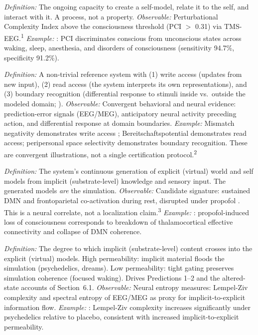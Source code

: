 \documentclass[12pt]{article}
\begin{document}
\begin{description}[leftmargin=0pt,labelindent=0pt,itemsep=0.8em]

\item[\textsc{Consciousness}] \emph{Definition:} The ongoing capacity to create a self-model, relate it to the self, and interact with it. A process, not a property. \emph{Observable:} Perturbational Complexity Index above the consciousness threshold (PCI $>$ 0.31) via TMS-EEG.\textsuperscript{1} \emph{Example:} \citet{Casarotto2016}: PCI discriminates conscious from unconscious states across waking, sleep, anesthesia, and disorders of consciousness (sensitivity 94.7\%, specificity 91.2\%).

\item[\textsc{Model}] \emph{Definition:} A non-trivial reference system with (1) write access (updates from new input), (2) read access (the system interprets its own representations), and (3) boundary recognition (differential response to stimuli inside vs.\ outside the modeled domain; \citealp{Gruber2015}). \emph{Observable:} Convergent behavioral and neural evidence: prediction-error signals (EEG/MEG), anticipatory neural activity preceding action, and differential response at domain boundaries. \emph{Example:} Mismatch negativity demonstrates write access \citep{Naatanen2007}; Bereitschaftspotential demonstrates read access; peripersonal space selectivity demonstrates boundary recognition. These are convergent illustrations, not a single certification protocol.\textsuperscript{2}

\item[\textsc{Self-simulation}] \emph{Definition:} The system's continuous generation of explicit (virtual) world and self models from implicit (substrate-level) knowledge and sensory input. The generated models \emph{are} the simulation. \emph{Observable:} Candidate signature: sustained DMN and frontoparietal co-activation during rest, disrupted under propofol \citep{Raichle2001}. This is a neural correlate, not a localization claim.\textsuperscript{3} \emph{Example:} \citet{Boly2012}: propofol-induced loss of consciousness corresponds to breakdown of thalamocortical effective connectivity and collapse of DMN coherence.

\item[\textsc{Permeability}] \emph{Definition:} The degree to which implicit (substrate-level) content crosses into the explicit (virtual) models. High permeability: implicit material floods the simulation (psychedelics, dreams). Low permeability: tight gating preserves simulation coherence (focused waking). Drives Predictions 1--2 and the altered-state accounts of Section~6.1. \emph{Observable:} Neural entropy measures: Lempel-Ziv complexity and spectral entropy of EEG/MEG as proxy for implicit-to-explicit information flow. \emph{Example:} \citet{Schartner2017}: Lempel-Ziv complexity increases significantly under psychedelics relative to placebo, consistent with increased implicit-to-explicit permeability.


\end{description}
\end{document}
